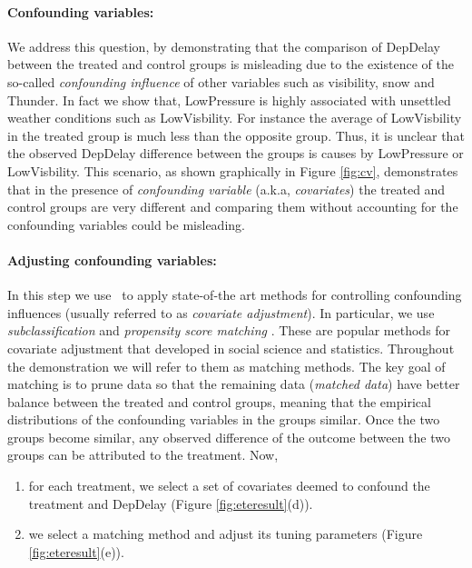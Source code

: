  \paragraph{\bf Confounding variables:} We address this question, by demonstrating that the comparison of DepDelay between the treated and control groups is misleading due to the existence of the so-called {\em  confounding influence} of other variables such as visibility, snow and Thunder.  In fact we show that, LowPressure is highly associated with unsettled weather conditions such as LowVisbility. For instance the average of LowVisbility in the treated group is much less than
  the opposite group. Thus, it is unclear that the observed DepDelay difference between the groups is causes by LowPressure or LowVisbility. This scenario, as shown graphically in Figure \ref{fig:cv}, demonstrates that in the presence of {\em confounding variable} (a.k.a, {\em covariates}) the treated and control groups are very different and comparing them without accounting for the confounding variables could be misleading.


 \paragraph{\bf Adjusting confounding variables:}
In this step we use \GSQL\ to apply state-of-the art methods for controlling confounding influences (usually referred to as {\em covariate adjustment}).
In particular, we use {\em subclassification} and {\it propensity score matching} \cite{Rubin1983b,IacKinPor09,rosenbaum1984reducing}.
These are popular methods for  covariate adjustment that developed in social science and statistics. Throughout the demonstration we will refer to them as matching methods.
The key goal of matching is to prune data so that
the remaining data ({\em matched data}) have better balance between the treated and control groups, meaning that the empirical distributions of the confounding variables in the groups  similar. 
Once the two groups become similar, any observed difference of the outcome between the two groups can be attributed to the treatment. Now,
     \begin{enumerate}
      \item for each treatment, we select a set of covariates deemed to confound the treatment and DepDelay (Figure \ref{fig:eteresult}(d)).
      \item we select a matching method and adjust its tuning parameters (Figure \ref{fig:eteresult}(e)).
\end{enumerate}


